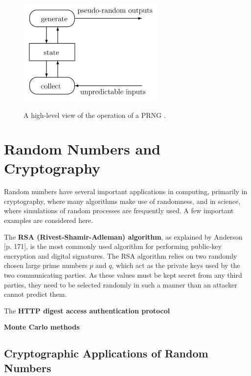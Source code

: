 \documentclass[12pt, titlepage]{report}
\theoremstyle{definition}
\begin{document}
\begin{figure}
\centering
\includegraphics[width=0.65\textwidth]{img/prng_high_level.png}\\
\caption{A high-level view of the operation of a PRNG \cite{kelsey1998cryptanalytic}.}
\label{figure:prng_high_level}
\end{figure}





\section{Random Numbers and Cryptography}
Random numbers have several important applications in computing, primarily in cryptography, where many algorithms make use of randomness, \cite[p. 137]{ ferguson2010cryptography} and in science, where simulations of random processes are frequently used\cite{deng2017developments}. A few important examples are considered here.

The \textbf{RSA (Rivest-Shamir-Adleman) algorithm}, as explained by Anderson [p. 171]\cite{anderson2010security}, is the most commonly used algorithm for performing public-key encryption and digital signatures. The RSA algorithm relies on two randomly chosen large prime numbers $p$ and $q$, which act as the private keys used by the two communicating parties. As these values must be kept secret from any third parties, they need to be selected randomly in such a manner than an attacker cannot predict them.

The \textbf{HTTP digest access authentication protocol} 

\textbf{Monte Carlo methods} 


\subsection{Cryptographic Applications of Random Numbers}
\end{document}
